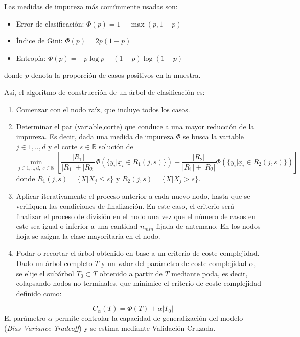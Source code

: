 \documentclass[12pt,a4paper,]{book}
\numberwithin{dummy}{section}
\theoremstyle{ocrenumbox}
\theoremstyle{blacknumex}
\theoremstyle{blacknumbox}
\theoremstyle{ocrenum}
\theoremstyle{ocrenum}
\begin{document}
Las medidas de impureza más comúnmente usadas son:

\begin{itemize}
\item
  Error de clasificación: \(\Phi(p) = 1 - \max(p,1-p)\)
\item
  Índice de Gini: \(\Phi(p) = 2p(1-p)\)
\item
  Entropía: \(\Phi(p) = -p \log p - (1 - p) \log (1 - p)\)
\end{itemize}

donde \(p\) denota la proporción de casos positivos en la muestra.

Así, el algoritmo de construcción de un árbol de clasificación es:

\begin{enumerate}
\def\labelenumi{\arabic{enumi}.}
\item
  Comenzar con el nodo raíz, que incluye todos los casos.
\item
  Determinar el par (variable,corte) que conduce a una mayor reducción
  de la impureza. Es decir, dada una medida de impureza \(\Phi\) se
  busca la variable \(j \in {1,..,d}\) y el corte \(s \in \mathbb{R}\)
  solución de \[\min_{j \in {1,..,d},\;s \in \mathbb{R}}\left[ 
  \frac{|R_1|}{|R_1|+|R_2|} \Phi \left(\{y_i |\underline x_i \in R_1(j,s)\} \right)  + 
  \frac{|R_2|}{|R_1|+|R_2|} \Phi \left(\{y_i |\underline x_i \in R_2(j,s)\} \right)\right]\]
  donde \(R_1(j,s) = \{X | X_j \le s \}\) y
  \(R_2(j,s) = \{X | X_j > s \}\).
\item
  Aplicar iterativamente el proceso anterior a cada nuevo nodo, hasta
  que se verifiquen las condiciones de finalización. En este caso, el
  criterio será finalizar el proceso de división en el nodo una vez que
  el número de casos en este sea igual o inferior a una cantidad
  \(n_{min}\) fijada de antemano. En los nodos hoja se asigna la clase
  mayoritaria en el nodo.
\item
  Podar o recortar el árbol obtenido en base a un criterio de
  coste-complejidad. Dado un árbol completo \(T\) y un valor del
  parámetro de coste-complejidad \(\alpha\), se elije el subárbol
  \(T_0 \subset T\) obtenido a partir de \(T\) mediante poda, es decir,
  colapsando nodos no terminales, que minimice el criterio de coste
  complejidad definido como:
\end{enumerate}

\[C_{\alpha}(T) = \Phi(T) + \alpha|T_0|\] El parámetro \(\alpha\)
permite controlar la capacidad de generalización del modelo
(\emph{Bias-Variance Tradeoff}) y se estima mediante Validación Cruzada.
\end{document}
